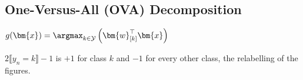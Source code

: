 \subsection{One-Versus-All (OVA) Decomposition}

\begin{algorithm}[H]
    \caption{One-Versus-All (OVA) Decomposition}\label{alg:ova}
    \Return \(g(\bm{x}) = \argmax_{k \in \mathcal{Y}} \left(
    \bm{w}_{[k]}^\top \bm{x} \right)\)\;
\end{algorithm}

\(2 \llbracket y_n = k \rrbracket - 1\) is \(+1\) for class \(k\) and \(-1\)
for every other class, the relabelling of the figures.

